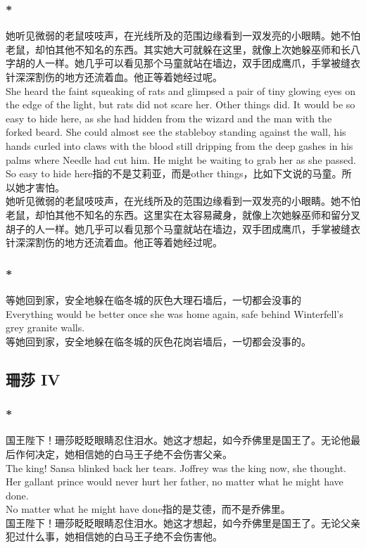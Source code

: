 \documentclass[12pt,a4paper]{article}
\newcommand{\h}[1]{{\color{red}#1}\\}
\newcommand{\la}[1]{{\color{blue}#1}\\}
\begin{document}
\subsubsection{\color{red}*}\la{
	 她听见微弱的老鼠吱吱声，在光线所及的范围边缘看到一双发亮的小眼睛。她不怕老鼠，却怕其他不知名的东西。其实她大可就躲在这里，就像上次她躲巫师和长八字胡的人一样。她几乎可以看见那个马童就站在墙边，双手团成鹰爪，手掌被缝衣针深深割伤的地方还流着血。他正等着她经过呢。\\
	 She heard the faint squeaking of rats and glimpsed a pair of tiny glowing eyes on the edge of the light, but rats did not scare her. Other things did. It would be so easy to hide here, as she had hidden from the wizard and the man with the forked beard. She could almost see the stableboy standing against the wall, his hands curled into claws with the blood still dripping from the deep gashes in his palms where Needle had cut him. He might be waiting to grab her as she passed.}\h{ 
	 So easy to hide here指的不是艾莉亚，而是other things，比如下文说的马童。所以她才害怕。}
	 她听见微弱的老鼠吱吱声，在光线所及的范围边缘看到一双发亮的小眼睛。她不怕老鼠，却怕其他不知名的东西。这里实在太容易藏身，就像上次她躲巫师和留分叉胡子的人一样。她几乎可以看见那个马童就站在墙边，双手团成鹰爪，手掌被缝衣针深深割伤的地方还流着血。他正等着她经过呢。
	 
\subsubsection{\color{red}*}\la{
	等她回到家，安全地躲在临冬城的灰色大理石墙后，一切都会没事的\\
	Everything would be better once she was home again, safe behind Winterfell's grey granite walls.}
	等她回到家，安全地躲在临冬城的灰色花岗岩墙后，一切都会没事的。
	
			
\subsection{珊莎 IV}
\subsubsection{\color{red}*}\la{
	国王陛下！珊莎眨眨眼睛忍住泪水。她这才想起，如今乔佛里是国王了。无论他最后作何决定，她相信她的白马王子绝不会伤害父亲。\\
	The king! Sansa blinked back her tears. Joffrey was the king now, she thought. Her gallant prince would never hurt her father, no matter what he might have done.}\h{
	No matter what he might have done指的是艾德，而不是乔佛里。}
	国王陛下！珊莎眨眨眼睛忍住泪水。她这才想起，如今乔佛里是国王了。无论父亲犯过什么事，她相信她的白马王子绝不会伤害他。
\end{document}
